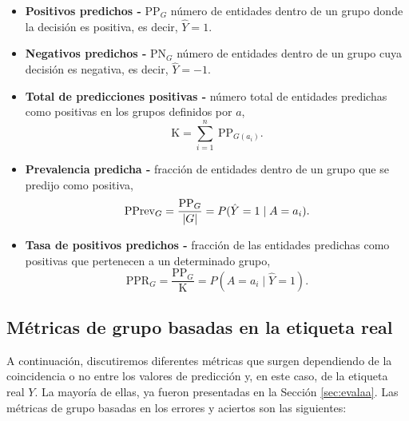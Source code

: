 \documentclass[oneside,openright,titlepage,numbers=noenddot,openany,headinclude,footinclude=true,
cleardoublepage=empty,abstractoff,BCOR=5mm,paper=a4,fontsize=12pt,main=spanish]{scrreprt}
\begin{document}
\begin{itemize}
    \item \textbf{Positivos predichos -} PP$_G$ número de entidades dentro de un grupo donde la decisión es positiva, es decir, $\hat{Y} = 1$.
    \item \textbf{Negativos predichos -} PN$_G$ número de entidades dentro de un grupo cuya decisión es negativa, es decir, $\hat{Y} = -1$.
    \item \textbf{Total de predicciones positivas -} número total de entidades predichas como positivas en los grupos definidos por $a$, $$\text{K} = \sum_{i=1}^{n} \  \text{PP}_{G(a_i)}.$$
    \item \textbf{Prevalencia predicha -} fracción de entidades dentro de un grupo que se predijo como positiva, $$\text{PPrev}_G = \frac{\text{PP}_G}{\left\lvert G\right\rvert} = P(\hat{Y}=1 \mid A=a_i).$$
    \item \textbf{Tasa de positivos predichos -} fracción de las entidades predichas como positivas que pertenecen a un determinado grupo, $$\text{PPR}_G = \frac{\text{PP}_G}{\text{K}} = P(A=a_i \mid \hat{Y}=1).$$
\end{itemize}

\subsection*{Métricas de grupo basadas en la etiqueta real}

A continuación, discutiremos diferentes métricas que surgen dependiendo de la coincidencia o no entre los valores de predicción y, en este caso, de la etiqueta real $Y$. La mayoría de ellas, ya fueron presentadas en la Sección \ref{sec:evalaa}. Las métricas de grupo basadas en los errores y aciertos son las siguientes:
\end{document}
